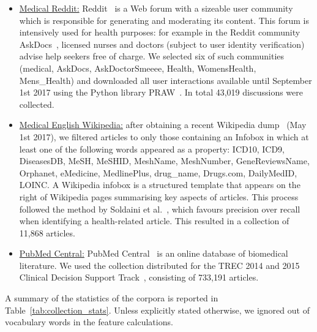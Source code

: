 \begin{itemize}[leftmargin=*]
    \item \underline{Medical Reddit:} Reddit~\cite{reddit} is a Web forum with a sizeable user community which is responsible for generating and moderating its content. %
    This forum is intensively used for health purposes: for example in the Reddit community AskDocs~\cite{redditaskdocs}, licensed nurses and doctors (subject to user identity verification) advise help seekers free of charge. We selected six of such communities
        (medical, AskDocs, AskDoctorSmeeee, Health, WomensHealth, Mens\_Health) and downloaded all user interactions available until September 1st 2017 using the Python library PRAW~\cite{redditapi}. In total 43,019 discussions were collected.

\item \underline{Medical English Wikipedia:} after obtaining a recent Wikipedia dump~\cite{wikipedia} (May 1st 2017), we filtered articles to only those containing an Infobox in which at least one of the following words appeared as a property: ICD10, ICD9, DiseasesDB, MeSH, MeSHID, MeshName, MeshNumber, GeneReviewsName, Orphanet, eMedicine, MedlinePlus, drug\_name, Drugs.com, DailyMedID, LOINC. A Wikipedia infobox is a structured template that appears on the right of Wikipedia pages summarising key aspects of articles. 
This process followed the method by Soldaini et al.~\cite{soldaini15}, which favours precision over recall when identifying a health-related article. This resulted in a collection of 11,868 articles. 

\item \underline{PubMed Central:} PubMed Central~\cite{pubmed} is an online  database of biomedical literature. We used the collection distributed for the TREC 2014 and 2015 Clinical Decision Support Track~\cite{roberts16,trec15}, consisting of 733,191 articles. 
 
\end{itemize}

A summary of the statistics of the corpora is reported in Table~\ref{tab:collection_stats}. 
Unless explicitly stated otherwise, we ignored out of vocabulary words in the feature calculations.

